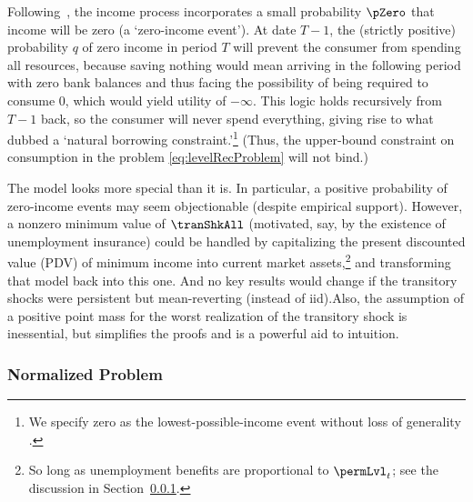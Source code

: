 \documentclass[BufferStockTheory]{subfiles}
\begin{document}
Following~\cite{zeldesStochastic}, the income process incorporates a small probability $\pZero$ that income will be zero (a `zero-income event').
At date $T-1$, the (strictly positive) probability $q$ of zero income in period $T$ will prevent the consumer from spending all resources, because saving nothing would mean arriving in the following period with zero bank balances and thus facing the possibility of being required to consume 0, which would yield utility of $-\infty$.
This logic holds recursively from $T-1$ back, so  the consumer will never spend everything, giving rise to what \cite{aiyagari:ge} dubbed a `natural borrowing constraint.'\footnote{We specify zero as the lowest-possible-income event without loss of generality \citep{aiyagari:ge}.} (Thus, the upper-bound constraint on consumption in the problem \eqref{eq:levelRecProblem} will not bind.)



\hypertarget{PDV}{}

The model looks more special than it is.
In particular, a positive probability of zero-income events may seem objectionable (despite empirical support).
However, a nonzero minimum value of $\tranShkAll$ (motivated, say, by the existence of unemployment insurance) could be handled by capitalizing the present discounted value (PDV) of minimum income into current market assets,\footnote{So long as unemployment benefits are proportional to $\permLvl_{t}$; see the discussion in Section~\ref{subsubsec:ratio}.} and transforming that model back into this one.
And no key results would change if the transitory shocks were persistent but mean-reverting (instead of iid).\@ Also, the assumption of a positive point mass for the worst realization of the transitory shock is inessential, but simplifies the proofs and is a powerful aid to intuition.

\hypertarget{The-Problem-Can-Be-Rewritten-in-Ratio-Form}{}
\hypertarget{The-Problem-Can-Be-Normalized-By-Permanent-Income}{}
\subsubsection{Normalized Problem}\label{subsubsec:ratio}
\end{document}
